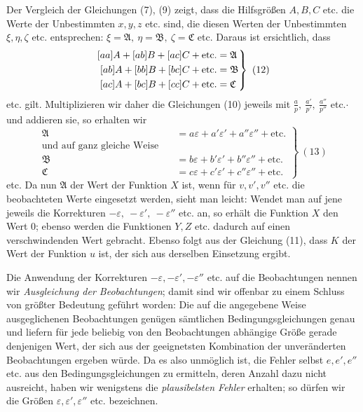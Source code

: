 Der Vergleich der Gleichungen (7), (9) zeigt, dass die Hilfsgrößen \(A,B,C\) etc. die Werte der Unbestimmten \(x,y,z\) etc. sind, die diesen Werten der Unbestimmten \(\xi,\eta,\zeta\) etc. entsprechen: \(\xi=\mathfrak A,\ \eta=\mathfrak B,\ \zeta=\mathfrak C\) etc. Daraus ist ersichtlich, dass
\[
\left.\begin{aligned}\relax
[aa]A+[ab]B+[ac]C+\text{etc.}&=\mathfrak A\\
[ab]A+[bb]B+[bc]C+\text{etc.}&=\mathfrak B\\
[ac]A+[bc]B+[cc]C+\text{etc.}&=\mathfrak C
\end{aligned}\right\}\ (12)
\]
etc. gilt. Multiplizieren wir daher die Gleichungen (10) jeweils mit \(\frac ap,\ \frac{a'}{p'},\ \frac{a''}{p''}\) etc.\(\cdot\) und addieren sie, so erhalten wir
\[
\left.\begin{aligned}
\mathfrak A&=a\varepsilon+a'\varepsilon'+a''\varepsilon''+\text{etc.}\\
\text{und auf ganz gleiche Weise}\quad&\\
\mathfrak B&=b\varepsilon+b'\varepsilon'+b''\varepsilon''+\text{etc.}\\
\mathfrak C&=c\varepsilon+c'\varepsilon'+c''\varepsilon''+\text{etc.}
\end{aligned}\right\}\ (13)
\]
etc. Da nun \(\mathfrak A\) der Wert der Funktion \(X\) ist, wenn für \(v,v',v''\) etc. die beobachteten Werte eingesetzt werden, sieht man leicht: Wendet man auf jene jeweils die Korrekturen \(-\varepsilon,\ -\varepsilon',\ -\varepsilon''\) etc. an, so erhält die Funktion \(X\) den Wert \(0\); ebenso werden die Funktionen
\(Y,Z\) etc. dadurch auf einen verschwindenden Wert gebracht. Ebenso folgt aus der Gleichung (11), dass \(K\) der Wert der Funktion \(u\) ist, der sich aus derselben Einsetzung ergibt.

Die Anwendung der Korrekturen \(-\varepsilon,-\varepsilon',-\varepsilon''\) etc. auf die Beobachtungen nennen wir \textit{Ausgleichung der Beobachtungen}; damit sind wir offenbar zu einem Schluss von größter Bedeutung geführt worden: Die auf die angegebene Weise ausgeglichenen Beobachtungen genügen sämtlichen Bedingungsgleichungen genau und liefern für jede beliebig von den Beobachtungen abhängige Größe gerade denjenigen Wert, der sich aus der geeignetsten Kombination der unveränderten Beobachtungen ergeben würde. Da es also unmöglich ist, die Fehler selbst \(e,e',e''\) etc. aus den Bedingungsgleichungen zu ermitteln, deren Anzahl dazu nicht ausreicht, haben wir wenigstens die \textit{plausibelsten Fehler} erhalten; so dürfen wir die Größen \(\varepsilon,\varepsilon',\varepsilon''\) etc. bezeichnen.

